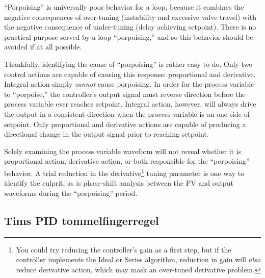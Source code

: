 ``Porpoising'' is universally poor behavior for a loop, because it combines the negative consequences of over-tuning (instability and excessive valve travel) with the negative consequence of under-tuning (delay achieving setpoint).  There is no practical purpose served by a loop ``porpoising,'' and so this behavior should be avoided if at all possible.

\vskip 10pt

Thankfully, identifying the cause of ``porpoising'' is rather easy to do.  Only two control actions are capable of causing this response: proportional and derivative.  Integral action simply \textit{cannot} cause porpoising.  In order for the process variable to ``porpoise,'' the controller's output signal must reverse direction before the process variable ever reaches setpoint.  Integral action, however, will always drive the output in a consistent direction when the process variable is on one side of setpoint.  Only proportional and derivative actions are capable of producing a directional change in the output signal prior to reaching setpoint.  

Solely examining the process variable waveform will not reveal whether it is proportional action, derivative action, or both responsible for the ``porpoising'' behavior.  A trial reduction in the derivative\footnote{You could try reducing the controller's gain as a first step, but if the controller implements the Ideal or Series algorithm, reduction in gain will \textit{also} reduce derivative action, which may mask an over-tuned derivative problem.} tuning parameter is one way to identify the culprit, as is phase-shift analysis between the PV and output waveforms during the ``porpoising'' period.  


\filbreak
\subsection{Tims PID tommelfingerregel}

